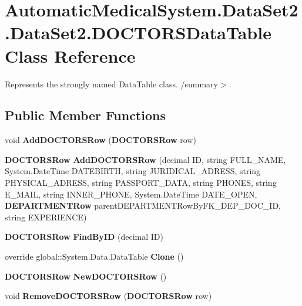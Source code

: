 \section{AutomaticMedicalSystem.DataSet2.DataSet2.DOCTORSDataTable Class Reference}
\label{class_automatic_medical_system_1_1_data_set2_1_1_d_o_c_t_o_r_s_data_table}
Represents the strongly named DataTable class. /summary$>$.  


\subsection*{Public Member Functions}
\begin{CompactItemize}
\item 
void \textbf{AddDOCTORSRow} ({\bf DOCTORSRow} row)\label{class_automatic_medical_system_1_1_data_set2_1_1_d_o_c_t_o_r_s_data_table_54eb38cca9ca7d998a41a1cdae54678f}

\item 
{\bf DOCTORSRow} \textbf{AddDOCTORSRow} (decimal ID, string FULL\_\-NAME, System.DateTime DATEBIRTH, string JURIDICAL\_\-ADRESS, string PHYSICAL\_\-ADRESS, string PASSPORT\_\-DATA, string PHONES, string E\_\-MAIL, string INNER\_\-PHONE, System.DateTime DATE\_\-OPEN, {\bf DEPARTMENTRow} parentDEPARTMENTRowByFK\_\-DEP\_\-DOC\_\-ID, string EXPERIENCE)\label{class_automatic_medical_system_1_1_data_set2_1_1_d_o_c_t_o_r_s_data_table_7b5d15d74d4cdf644485528a637f1057}

\item 
{\bf DOCTORSRow} \textbf{FindByID} (decimal ID)\label{class_automatic_medical_system_1_1_data_set2_1_1_d_o_c_t_o_r_s_data_table_4cabd6ae5680d062bd3808a722f52313}

\item 
override global::System.Data.DataTable \textbf{Clone} ()\label{class_automatic_medical_system_1_1_data_set2_1_1_d_o_c_t_o_r_s_data_table_bfb5c8351fff9b4c31a12cd339138cda}

\item 
{\bf DOCTORSRow} \textbf{NewDOCTORSRow} ()\label{class_automatic_medical_system_1_1_data_set2_1_1_d_o_c_t_o_r_s_data_table_bbad25613a890465d94800813e12cfbf}

\item 
void \textbf{RemoveDOCTORSRow} ({\bf DOCTORSRow} row)\label{class_automatic_medical_system_1_1_data_set2_1_1_d_o_c_t_o_r_s_data_table_aaedafbb643e5de5217a6d8039f2b236}

\end{CompactItemize}
